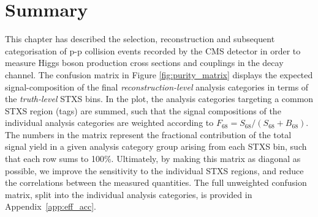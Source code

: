 \section{Summary}

This chapter has described the selection, reconstruction and subsequent categorisation of p-p collision events recorded by the CMS detector in order to measure Higgs boson production cross sections and couplings in the \Hgg decay channel. The confusion matrix in Figure \ref{fig:purity_matrix} displays the expected signal-composition of the final \textit{reconstruction-level} analysis categories in terms of the \textit{truth-level} STXS bins. In the plot, the analysis categories targeting a common STXS region (tags) are summed, such that the signal compositions of the individual analysis categories are weighted according to $F_{68}=S_{68}/(S_{68}+B_{68})$. The numbers in the matrix represent the fractional contribution of the total signal yield in a given analysis category group arising from each STXS bin, such that each row sums to 100\%. Ultimately, by making this matrix as diagonal as possible, we improve the sensitivity to the individual STXS regions, and reduce the correlations between the measured quantities. The full unweighted confusion matrix, split into the individual analysis categories, is provided in Appendix~\ref{app:eff_acc}.

